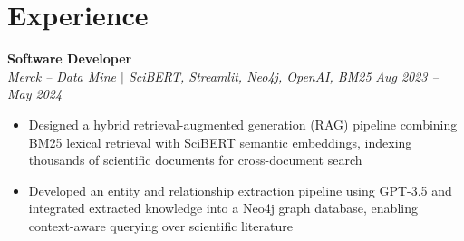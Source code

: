 \documentclass[10pt,letterpaper]{article}
\newcommand{\heading}[4]{%
  \noindent\textbf{#1} \hfill #2\\
  \textit{#3} \hfill \textit{#4}\par
}
\newcommand{\headingsimple}[2]{%
  \noindent\textbf{#1} \hfill #2\par
}
\begin{document}

\section{Experience}



\heading{Software Developer}{}{Merck -- Data Mine $|$ SciBERT, Streamlit, Neo4j, OpenAI, BM25}{Aug 2023 -- May 2024}
\begin{itemize}
  \item Designed a hybrid retrieval-augmented generation (RAG) pipeline combining BM25 lexical retrieval with SciBERT semantic embeddings, indexing thousands of scientific documents for cross-document search
  \item Developed an entity and relationship extraction pipeline using GPT-3.5 and integrated extracted knowledge into a Neo4j graph database, enabling context-aware querying over scientific literature
\end{itemize}
\end{document}
